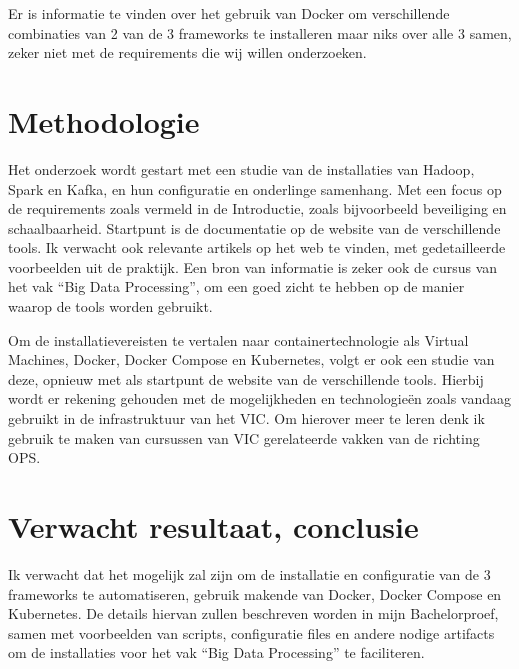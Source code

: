 Er is informatie te vinden over het gebruik van Docker om verschillende combinaties van 2 van de 3 frameworks te installeren maar niks over alle 3 samen, zeker niet met de requirements die wij willen onderzoeken. 


\section{Methodologie}%
\label{sec:methodologie}
Het onderzoek wordt gestart met een studie van de installaties van Hadoop, Spark en Kafka, en hun configuratie en onderlinge samenhang.
Met een focus op de requirements zoals vermeld in de Introductie, zoals bijvoorbeeld beveiliging en schaalbaarheid.
Startpunt is de documentatie op de website van de verschillende tools. Ik verwacht ook relevante artikels op het web te vinden, met gedetailleerde voorbeelden uit de praktijk.
Een bron van informatie is zeker ook de cursus van het vak ``Big Data Processing'', om een goed zicht te hebben op de manier waarop de tools worden gebruikt.

Om de installatievereisten te vertalen naar containertechnologie als Virtual Machines, Docker, Docker Compose en Kubernetes, volgt er ook een studie van deze, opnieuw met als startpunt de website van de verschillende tools.
Hierbij wordt er rekening gehouden met de mogelijkheden en technologieën zoals vandaag gebruikt in de infrastruktuur van het VIC. Om hierover meer te leren denk ik gebruik te maken van cursussen van VIC gerelateerde vakken van de richting OPS.

\section{Verwacht resultaat, conclusie}%
\label{sec:verwachte_resultaten}
Ik verwacht dat het mogelijk zal zijn om de installatie en configuratie van de 3 frameworks te automatiseren, gebruik makende van Docker, Docker Compose en Kubernetes.
De details hiervan zullen beschreven worden in mijn Bachelorproef, samen met voorbeelden van scripts, configuratie files en andere nodige artifacts om de installaties voor het vak ``Big Data Processing'' te faciliteren.
